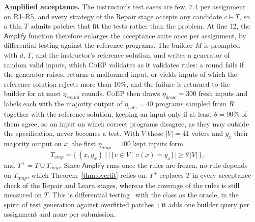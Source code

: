 \documentclass[acmsmall,screen,review,anonymous,nonacm]{acmart}
\newcommand{\tool}{\textsc{CoEP}\xspace}
\newcommand{\aux}[1]{\ensuremath{\mathsf{#1}}}
\newcommand{\V}[1]{\ensuremath{\mathit{#1}}}
\begin{document}
\textbf{Amplified acceptance.} The instructor's test cases are few, 7.4 per assignment on R1--R5, and every strategy of the Repair stage accepts any candidate $c \models T$, so a thin $T$ admits patches that fit the tests rather than the problem. At line 12, the \aux{Amplify} function therefore enlarges the acceptance suite once per assignment, by differential testing against the reference programs. The builder $M$ is prompted with $d$, $T$, and the instructor's reference solution, and writes a generator of random valid inputs, which \tool validates as it validates rules: a round fails if the generator raises, returns a malformed input, or yields inputs of which the reference solution rejects more than 10\%, and the failure is returned to the builder for at most $\eta_{\V{round}}$ rounds. \tool then draws $\eta_{\V{draw}} = 300$ fresh inputs and labels each with the majority output of $\eta_{\V{vote}} = 40$ programs sampled from $R$ together with the reference solution, keeping an input only if at least $\theta = 90\%$ of them agree, so an input on which correct programs disagree, as they may outside the specification, never becomes a test. With $V$ these $|V| = 41$ voters and $y_x$ their majority output on $x$, the first $\eta_{\V{amp}} = 100$ kept inputs form
\[
T_{\V{amp}} = \{\, (x, y_x) \mid \lvert\{ v \in V \mid v(x) = y_x \}\rvert \ge \theta\,\lvert V\rvert \,\},
\]
and $T^{+} = T \cup T_{\V{amp}}$. Since \aux{Amplify} runs once the rules are frozen, no rule depends on $T_{\V{amp}}$, which Theorem~\ref{thm:overfit} relies on. $T^{+}$ replaces $T$ in every acceptance check of the Repair and Learn stages, whereas the coverage of the rules is still measured on $T$. This is differential testing~\cite{mckeeman1998differential} with the class as the oracle, in the spirit of test generation against overfitted patches~\cite{smith2015cure,xin2017identifying}; it adds one builder query per assignment and none per submission.
\end{document}
